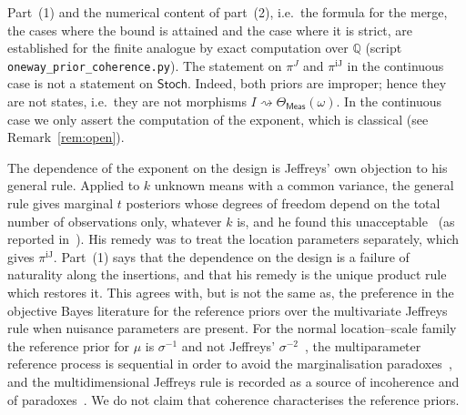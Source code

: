 \documentclass[11pt,a4paper]{article}
\theoremstyle{plain}
\theoremstyle{definition}
\theoremstyle{remark}
\newcommand{\cat}[1]{\mathsf{#1}}
\newcommand{\Meas}{\cat{Meas}}
\newcommand{\Stoch}{\cat{Stoch}}
\begin{document}
Part~(1) and the numerical content of part~(2), i.e.\ the formula for the
merge, the cases where the bound is attained and the case where it is strict,
are established for the finite analogue by exact computation over $\mathbb{Q}$
(script \texttt{oneway\_\allowbreak prior\_\allowbreak coherence.py}). The
statement on $\pi^{J}$ and $\pi^{\mathrm{iJ}}$ in the continuous case is not a
statement on $\Stoch$. Indeed, both priors are improper; hence they are not
states, i.e.\ they are not morphisms
$I \rightsquigarrow \Theta_\Meas(\omega)$. In the continuous case we only
assert the computation of the exponent, which is classical (see
Remark~\ref{rem:open}).

The dependence of the exponent on the design is Jeffreys' own objection to his
general rule. Applied to $k$ unknown means with a common variance, the general
rule gives marginal $t$ posteriors whose degrees of freedom depend on the total
number of observations only, whatever $k$ is, and he found this
unacceptable~\cite[p.~182]{jeffreys_theory_1961} (as reported
in~\cite[p.~1345]{kass_selection_1996}). His remedy was to treat the location
parameters separately, which gives $\pi^{\mathrm{iJ}}$. Part~(1) says that the
dependence on the design is a failure of naturality along the insertions, and
that his remedy is the unique product rule which restores it. This agrees
with, but is not the same as, the preference in the objective Bayes literature
for the reference priors over the multivariate Jeffreys rule when nuisance
parameters are present. For the normal location--scale family the reference
prior for $\mu$ is $\sigma^{-1}$ and not Jeffreys'
$\sigma^{-2}$~\cite[p.~119]{bernardo_reference_1979}, the multiparameter
reference process is sequential in order to avoid the marginalisation
paradoxes~\cite[pp.~905--906]{berger_formal_2009}, and the multidimensional
Jeffreys rule is recorded as a source of incoherence and of
paradoxes~\cite[p.~631]{consonni_prior_2018}. We do not claim that coherence
characterises the reference priors.
\end{document}
